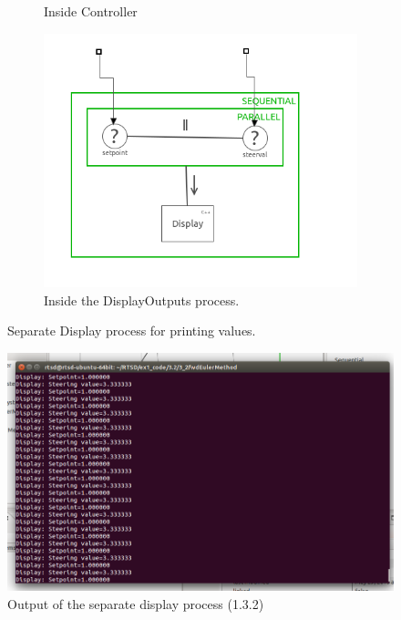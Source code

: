 \documentclass[a4paper,twoside,11pt]{article}
\begin{document}
\begin{figure}
\begin{subfigure}{0.6\textwidth}
	 \caption{Inside Controller }
	 \label{fig:3_2_controller}
	\end{subfigure}%
	\begin{subfigure}{0.6\textwidth}
	 \centering
	 \includegraphics[width=\textwidth]{./images/3-2_display.png}
	 \caption{Inside the DisplayOutputs process.}
	 \label{fig:3_2_display}
	\end{subfigure}
	\caption{Separate Display process for printing values.}
	\label{fig:3_2_model}
\end{figure}

\begin{figure}
	\centering
	\includegraphics[width=\textwidth]{./images/3-2_output.png}
	\caption{Output of the separate display process (1.3.2)}
	\label{fig:3_2_output}
\end{figure}
\end{document}
